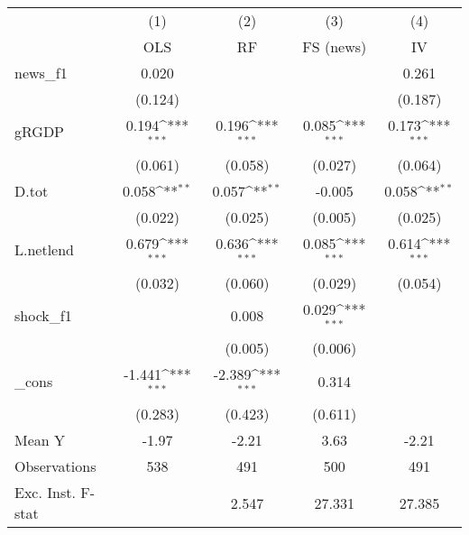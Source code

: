 {
\def\sym#1{\ifmmode^{#1}\else\(^{#1}\)\fi}
\begin{tabular}{l*{4}{c}}
\toprule
            &\multicolumn{1}{c}{(1)}&\multicolumn{1}{c}{(2)}&\multicolumn{1}{c}{(3)}&\multicolumn{1}{c}{(4)}\\
            &\multicolumn{1}{c}{OLS}&\multicolumn{1}{c}{RF}&\multicolumn{1}{c}{FS (news)}&\multicolumn{1}{c}{IV}\\
\midrule
news\_f1     &       0.020         &                     &                     &       0.261         \\
            &     (0.124)         &                     &                     &     (0.187)         \\
\addlinespace
gRGDP       &       0.194\sym{***}&       0.196\sym{***}&       0.085\sym{***}&       0.173\sym{***}\\
            &     (0.061)         &     (0.058)         &     (0.027)         &     (0.064)         \\
\addlinespace
D.tot       &       0.058\sym{**} &       0.057\sym{**} &      -0.005         &       0.058\sym{**} \\
            &     (0.022)         &     (0.025)         &     (0.005)         &     (0.025)         \\
\addlinespace
L.netlend   &       0.679\sym{***}&       0.636\sym{***}&       0.085\sym{***}&       0.614\sym{***}\\
            &     (0.032)         &     (0.060)         &     (0.029)         &     (0.054)         \\
\addlinespace
shock\_f1    &                     &       0.008         &       0.029\sym{***}&                     \\
            &                     &     (0.005)         &     (0.006)         &                     \\
\addlinespace
\_cons      &      -1.441\sym{***}&      -2.389\sym{***}&       0.314         &                     \\
            &     (0.283)         &     (0.423)         &     (0.611)         &                     \\
\midrule
Mean Y      &       -1.97         &       -2.21         &        3.63         &       -2.21         \\
Observations&         538         &         491         &         500         &         491         \\
Exc. Inst. F-stat&                     &       2.547         &      27.331         &      27.385         \\
\bottomrule
\end{tabular}
}
